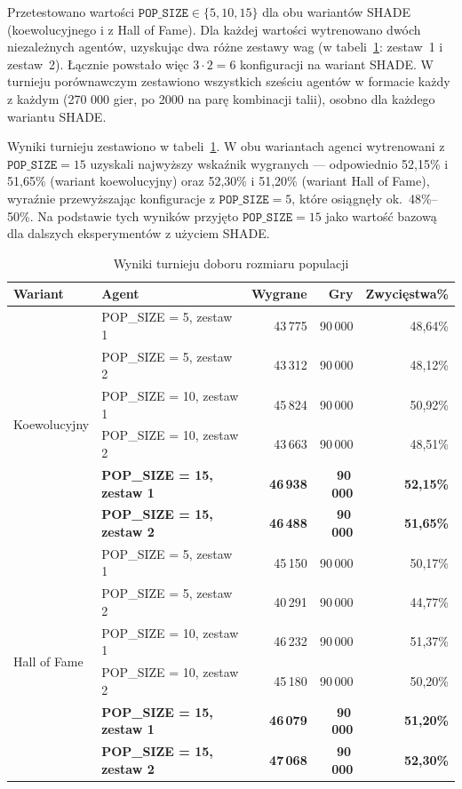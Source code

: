 Przetestowano wartości $\texttt{POP\_SIZE} \in \{5, 10, 15\}$ dla obu wariantów SHADE (koewolucyjnego i z Hall of Fame). Dla każdej wartości wytrenowano dwóch niezależnych agentów, uzyskując dwa różne zestawy wag (w tabeli~\ref{tab:popsize}: zestaw~1 i zestaw~2). Łącznie powstało więc $3 \cdot 2 = 6$ konfiguracji na wariant SHADE. W turnieju porównawczym zestawiono wszystkich sześciu agentów w formacie każdy z każdym (270 000 gier, po 2000 na parę kombinacji talii), osobno dla każdego wariantu SHADE.

Wyniki turnieju zestawiono w tabeli~\ref{tab:popsize}. W obu wariantach agenci wytrenowani z $\texttt{POP\_SIZE} = 15$ uzyskali najwyższy wskaźnik wygranych --- odpowiednio 52,15\% i 51,65\% (wariant koewolucyjny) oraz 52,30\% i 51,20\% (wariant Hall of Fame), wyraźnie przewyższając konfiguracje z $\texttt{POP\_SIZE} = 5$, które osiągnęły ok.\ 48\%--50\%. Na podstawie tych wyników przyjęto $\texttt{POP\_SIZE} = 15$ jako wartość bazową dla dalszych eksperymentów z użyciem SHADE.

\begin{table}[!h]
\centering
\caption{Wyniki turnieju doboru rozmiaru populacji}  \label{tab:popsize}
\begin{tabular}{llrrr}
\toprule
Wariant & Agent & Wygrane & Gry & Zwycięstwa\% \\
\midrule
\multirow{6}{*}{Koewolucyjny}
    & POP\_SIZE = 5,  zestaw 1 & 43\,775 & 90\,000 & 48,64\% \\
    & POP\_SIZE = 5,  zestaw 2 & 43\,312 & 90\,000 & 48,12\% \\
    & POP\_SIZE = 10, zestaw 1 & 45\,824 & 90\,000 & 50,92\% \\
    & POP\_SIZE = 10, zestaw 2 & 43\,663 & 90\,000 & 48,51\% \\
    & \textbf{POP\_SIZE = 15, zestaw 1} & \textbf{46\,938} & \textbf{90\,000} & \textbf{52,15\%} \\
    & \textbf{POP\_SIZE = 15, zestaw 2} & \textbf{46\,488} & \textbf{90\,000} & \textbf{51,65\%} \\
\midrule
\multirow{6}{*}{Hall of Fame}
    & POP\_SIZE = 5,  zestaw 1 & 45\,150 & 90\,000 & 50,17\% \\
    & POP\_SIZE = 5,  zestaw 2 & 40\,291 & 90\,000 & 44,77\% \\
    & POP\_SIZE = 10, zestaw 1 & 46\,232 & 90\,000 & 51,37\% \\
    & POP\_SIZE = 10, zestaw 2 & 45\,180 & 90\,000 & 50,20\% \\
    & \textbf{POP\_SIZE = 15, zestaw 1} & \textbf{46\,079} & \textbf{90\,000} & \textbf{51,20\%} \\
    & \textbf{POP\_SIZE = 15, zestaw 2} & \textbf{47\,068} & \textbf{90\,000} & \textbf{52,30\%} \\
\bottomrule
\end{tabular}
\end{table}

